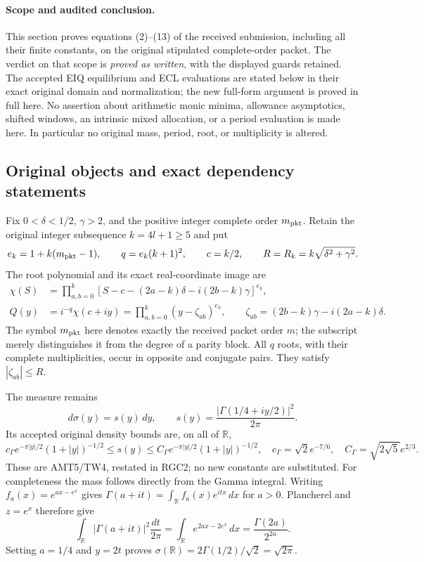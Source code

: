 \documentclass[11pt,a4paper]{article}
\begin{document}
\paragraph{Scope and audited conclusion.}
This section proves equations (2)--(13) of the received submission,
including all their finite constants,
on the original stipulated complete-order packet. The verdict on that scope is
\emph{proved as written}, with the displayed guards retained. The accepted
EIQ equilibrium and ECL evaluations are stated below in their exact original
domain and normalization; the new full-form argument is proved in full here.
No assertion about arithmetic monic minima, allowance asymptotics, shifted
windows, an intrinsic mixed allocation, or a period evaluation is made here.
In particular no original mass, period, root, or multiplicity is altered.

\subsection{Original objects and exact dependency statements}

Fix $0<\delta<1/2$, $\gamma>2$, and the positive integer complete order
$m_{\rm pkt}$. Retain the original integer subsequence $k=4l+1\ge5$ and put
\[
 e_k=1+k(m_{\rm pkt}-1),\qquad q=e_k(k+1)^2,\qquad c=k/2,
 \qquad R=R_k=k\sqrt{\delta^2+\gamma^2}.
\]
The root polynomial and its exact real-coordinate image are
\begin{align*}
 \chi(S)&=\prod_{a,b=0}^k
 [S-c-(2a-k)\delta-i(2b-k)\gamma]^{e_k},\\
 Q(y)&=i^{-q}\chi(c+iy)
      =\prod_{a,b=0}^k(y-\zeta_{ab})^{e_k},
 \qquad \zeta_{ab}=(2b-k)\gamma-i(2a-k)\delta.
\end{align*}
The symbol $m_{\rm pkt}$ here denotes exactly the received packet order $m$;
the subscript merely distinguishes it from the degree of a parity block.
All $q$ roots, with their complete multiplicities, occur in opposite and
conjugate pairs. They satisfy $|\zeta_{ab}|\le R$.

The measure remains
\[
 d\sigma(y)=s(y)\,d y,
 \qquad s(y)=\frac{|\Gamma(1/4+iy/2)|^2}{2\pi}.
\]
Its accepted original density bounds are, on all of $\mathbb R$,
\begin{equation*}\tag{GRF1}\label{GRF:density}
 c_\Gamma e^{-\pi|y|/2}(1+|y|)^{-1/2}
 \le s(y)\le
 C_\Gamma e^{-\pi|y|/2}(1+|y|)^{-1/2},
 \quad
 c_\Gamma=\sqrt2e^{-7/6},\quad
 C_\Gamma=\sqrt{2\sqrt5}e^{2/3}.
\end{equation*}
These are AMT5/TW4, restated in RGC2; no new constants are substituted.
For completeness the mass follows directly from the Gamma integral.
Writing $f_a(x)=e^{ax-e^x}$ gives
$\Gamma(a+it)=\int_\mathbb R f_a(x)e^{itx}\,d x$ for $a>0$.
Plancherel and $z=e^x$ therefore give
\[
 \int_\mathbb R |\Gamma(a+it)|^2\frac{dt}{2\pi}
 =\int_\mathbb R e^{2ax-2e^x}\,d x
 =\frac{\Gamma(2a)}{2^{2a}}.
\]
Setting $a=1/4$ and $y=2t$ proves
$\sigma(\mathbb R)=2\Gamma(1/2)/\sqrt2=\sqrt{2\pi}$.
\end{document}
